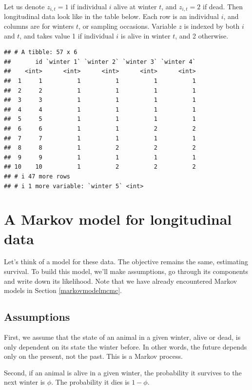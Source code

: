 \documentclass[
  12pt,
]{krantz}
\begin{document}
Let us denote \(z_{i,t} = 1\) if individual \(i\) alive at winter \(t\), and \(z_{i,t} = 2\) if dead. Then longitudinal data look like in the table below. Each row is an individual \(i\), and columns are for winters \(t\), or sampling occasions. Variable \(z\) is indexed by both \(i\) and \(t\), and takes value 1 if individual \(i\) is alive in winter \(t\), and 2 otherwise.

\begin{verbatim}
## # A tibble: 57 x 6
##       id `winter 1` `winter 2` `winter 3` `winter 4`
##    <int>      <int>      <int>      <int>      <int>
##  1     1          1          1          1          1
##  2     2          1          1          1          1
##  3     3          1          1          1          1
##  4     4          1          1          1          1
##  5     5          1          1          1          1
##  6     6          1          1          2          2
##  7     7          1          1          1          1
##  8     8          1          2          2          2
##  9     9          1          1          1          1
## 10    10          1          2          2          2
## # i 47 more rows
## # i 1 more variable: `winter 5` <int>
\end{verbatim}

\section{A Markov model for longitudinal data}\label{a-markov-model-for-longitudinal-data}

Let's think of a model for these data. The objective remains the same, estimating survival. To build this model, we'll make assumptions, go through its components and write down its likelihood. Note that we have already encountered Markov models in Section \ref{markovmodelmcmc}.

\subsection{Assumptions}\label{assumptions}

First, we assume that the state of an animal in a given winter, alive or dead, is only dependent on its state the winter before. In other words, the future depends only on the present, not the past. This is a Markov process.

Second, if an animal is alive in a given winter, the probability it survives to the next winter is \(\phi\). The probability it dies is \(1 - \phi\).
\end{document}
